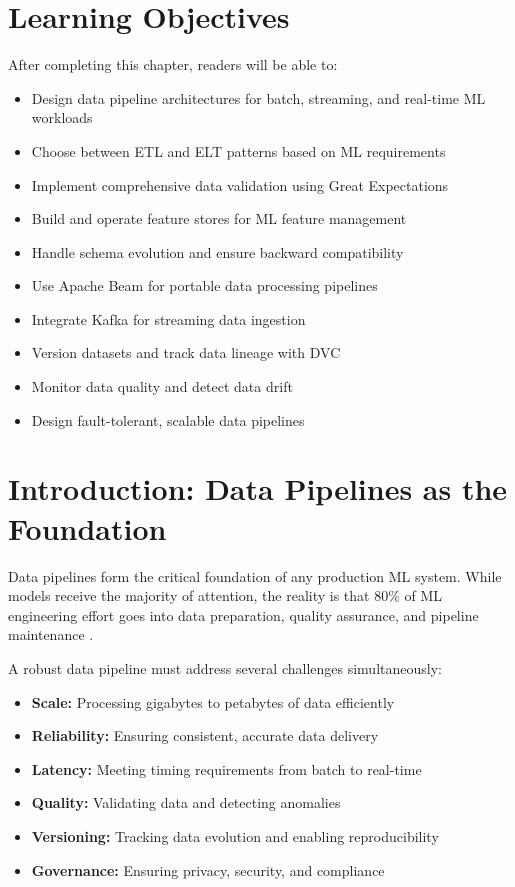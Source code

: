 \section{Learning Objectives}

After completing this chapter, readers will be able to:
\begin{itemize}
    \item Design data pipeline architectures for batch, streaming, and real-time ML workloads
    \item Choose between ETL and ELT patterns based on ML requirements
    \item Implement comprehensive data validation using Great Expectations
    \item Build and operate feature stores for ML feature management
    \item Handle schema evolution and ensure backward compatibility
    \item Use Apache Beam for portable data processing pipelines
    \item Integrate Kafka for streaming data ingestion
    \item Version datasets and track data lineage with DVC
    \item Monitor data quality and detect data drift
    \item Design fault-tolerant, scalable data pipelines
\end{itemize}

\section{Introduction: Data Pipelines as the Foundation}

Data pipelines form the critical foundation of any production ML system. While models receive the majority of attention, the reality is that 80\% of ML engineering effort goes into data preparation, quality assurance, and pipeline maintenance \citep{cognilytica2020}.

A robust data pipeline must address several challenges simultaneously:

\begin{itemize}
    \item \textbf{Scale:} Processing gigabytes to petabytes of data efficiently
    \item \textbf{Reliability:} Ensuring consistent, accurate data delivery
    \item \textbf{Latency:} Meeting timing requirements from batch to real-time
    \item \textbf{Quality:} Validating data and detecting anomalies
    \item \textbf{Versioning:} Tracking data evolution and enabling reproducibility
    \item \textbf{Governance:} Ensuring privacy, security, and compliance
\end{itemize}

